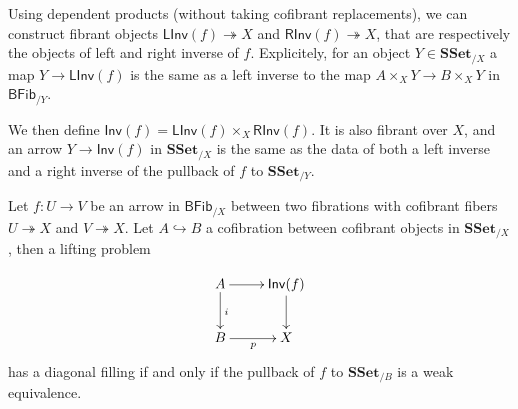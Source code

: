 \documentclass[reqno,10pt,a4paper,oneside,draft]{amsart}
\numberwithin{equation}{section}
\theoremstyle{mythm}
\theoremstyle{mydef}
\theoremstyle{myrmk}
\newcommand{\SSet}{\mathbf{SSet}}
\newcommand{\Iseq}{\mathsf{Inv}}
\newcommand{\Linv}{\mathsf{LInv}}
\newcommand{\Rinv}{\mathsf{RInv}}
\newcommand{\BFFib}{\mathsf{BFib}}
\begin{document}
Using dependent products (without taking cofibrant replacements), we can construct fibrant objects $\Linv(f) \twoheadrightarrow X$ and $\Rinv(f) \twoheadrightarrow X$, that are respectively the objects of left and right inverse of $f$. Explicitely, for an object $Y \in \SSet_{/X}$ a map $Y \to \Linv(f)$ is the same as a left inverse to the map $A \times_{X} Y \to B \times_X Y$ in $\BFFib_{/Y}$.

We then define $\Iseq(f) = \Linv(f) \times_X \Rinv(f)$. It is also fibrant over $X$, and an arrow $Y \to \Iseq(f)$ in $\SSet_{/X}$ is the same as the data of both a left inverse and a right inverse of the pullback of $f$ to $\SSet_{/Y}$.


\begin{proposition} \label{thm:black-box}
Let $f:U \to V$ be an arrow in $\BFFib_{/X}$ between two fibrations with cofibrant fibers $U \twoheadrightarrow X$ and $V \twoheadrightarrow X$. Let $A \hookrightarrow B$ a cofibration between cofibrant objects in $\SSet_{/X}$, then a lifting problem

\[
\xymatrix{ A \ar[r] \ar[d]^i & \Iseq(f) \ar[d] \\
B \ar[r]_{p} & X
}
\]
has a diagonal filling if and only if the pullback of $f$ to $\SSet_{/B}$ is a weak equivalence.
\end{proposition}
\end{document}
